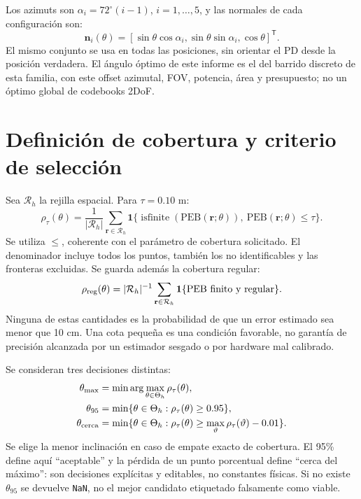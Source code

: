\documentclass[11pt,a4paper]{article}
\begin{document}
Los azimuts son $\alpha_i=72^\circ(i-1)$, $i=1,\ldots,5$, y las normales de cada configuración son:
\begin{equation}
 \mathbf n_i(\theta)=[\sin\theta\cos\alpha_i,\sin\theta\sin\alpha_i,\cos\theta]^{\mathsf T}.
\end{equation}
El mismo conjunto se usa en todas las posiciones, sin orientar el PD desde la posición verdadera. El ángulo óptimo de este informe es el del barrido discreto de esta familia, con este offset azimutal, FOV, potencia, área y presupuesto; no un óptimo global de codebooks 2DoF.

\section{Definición de cobertura y criterio de selección}
Sea $\mathcal R_h$ la rejilla espacial. Para $\tau=0.10$ m:
\begin{equation}
 \rho_{\tau}(\theta)=\frac1{|\mathcal R_h|}\sum_{\mathbf r\in\mathcal R_h}
 \mathbf1\{\operatorname{isfinite}(\mathrm{PEB}(\mathbf r;\theta)),\ \mathrm{PEB}(\mathbf r;\theta)\leq\tau\}.
\label{eq:coverage}
\end{equation}
Se utiliza $\leq$, coherente con el parámetro de cobertura solicitado. El denominador incluye todos los puntos, también los no identificables y las fronteras excluidas. Se guarda además la cobertura regular:
\begin{equation}
 \rho_{\rm reg}(\theta)=|\mathcal R_h|^{-1}\sum_{\mathbf r\in\mathcal R_h}\mathbf1\{\mathrm{PEB}\ \text{finito y regular}\}.
\end{equation}
Ninguna de estas cantidades es la probabilidad de que un error estimado sea menor que 10 cm. Una cota pequeña es una condición favorable, no garantía de precisión alcanzada por un estimador sesgado o por hardware mal calibrado.

Se consideran tres decisiones distintas:
\begin{align}
 \theta_{\rm max}&=\min\arg\max_{\theta\in\Theta_h}\rho_\tau(\theta),\\
 \theta_{95}&=\min\{\theta\in\Theta_h:\rho_\tau(\theta)\geq0.95\},\\
 \theta_{\rm cerca}&=\min\{\theta\in\Theta_h:\rho_\tau(\theta)\geq\max_{\vartheta}\rho_\tau(\vartheta)-0.01\}.
\end{align}
Se elige la menor inclinación en caso de empate exacto de cobertura. El 95\% define aquí ``aceptable'' y la pérdida de un punto porcentual define ``cerca del máximo'': son decisiones explícitas y editables, no constantes físicas. Si no existe $\theta_{95}$ se devuelve \texttt{NaN}, no el mejor candidato etiquetado falsamente como viable.
\end{document}
